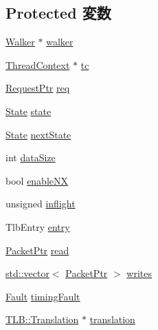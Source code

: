 \subsection*{Protected 変数}
\begin{DoxyCompactItemize}
\item 
\hyperlink{classX86ISA_1_1Walker}{Walker} $\ast$ \hyperlink{classX86ISA_1_1Walker_1_1WalkerState_a54537e5fcbe2d6f609ca4c90a48a06a8}{walker}
\item 
\hyperlink{classThreadContext}{ThreadContext} $\ast$ \hyperlink{classX86ISA_1_1Walker_1_1WalkerState_a4455a4759e69e5ebe68ae7298cbcc37d}{tc}
\item 
\hyperlink{classRequest}{RequestPtr} \hyperlink{classX86ISA_1_1Walker_1_1WalkerState_a956cd41d82347558b9c0a5b0474903f2}{req}
\item 
\hyperlink{classX86ISA_1_1Walker_1_1WalkerState_a5d74787dedbc4e11c1ab15bf487e61f8}{State} \hyperlink{classX86ISA_1_1Walker_1_1WalkerState_a876b486d3a5241a126bd5751c5f70f79}{state}
\item 
\hyperlink{classX86ISA_1_1Walker_1_1WalkerState_a5d74787dedbc4e11c1ab15bf487e61f8}{State} \hyperlink{classX86ISA_1_1Walker_1_1WalkerState_a02eca985bd74ea3c516fd47e6f1a7a0d}{nextState}
\item 
int \hyperlink{classX86ISA_1_1Walker_1_1WalkerState_a8c8e474bb8d2c6f7162455416b488e50}{dataSize}
\item 
bool \hyperlink{classX86ISA_1_1Walker_1_1WalkerState_a9a6fe7947a40e784ed47a05da0678825}{enableNX}
\item 
unsigned \hyperlink{classX86ISA_1_1Walker_1_1WalkerState_a9e6c5c16902269a9053480d064cacb9c}{inflight}
\item 
TlbEntry \hyperlink{classX86ISA_1_1Walker_1_1WalkerState_a67e11800589d9e3f891debb46889da99}{entry}
\item 
\hyperlink{classPacket}{PacketPtr} \hyperlink{classX86ISA_1_1Walker_1_1WalkerState_a80c062ee2cb2c5ef258a0bcf0d35ef19}{read}
\item 
\hyperlink{classstd_1_1vector}{std::vector}$<$ \hyperlink{classPacket}{PacketPtr} $>$ \hyperlink{classX86ISA_1_1Walker_1_1WalkerState_ad878e24435696fc6f83c7b321d1cfb37}{writes}
\item 
\hyperlink{classRefCountingPtr}{Fault} \hyperlink{classX86ISA_1_1Walker_1_1WalkerState_ad64dd28e7be7f7f688e78a39d4c7d051}{timingFault}
\item 
\hyperlink{classBaseTLB_1_1Translation}{TLB::Translation} $\ast$ \hyperlink{classX86ISA_1_1Walker_1_1WalkerState_af4dc79732f6962bb42c1d73da32ee926}{translation}

\end{DoxyCompactItemize}

